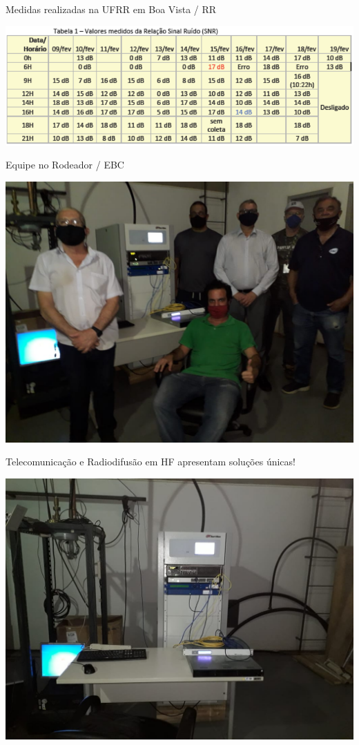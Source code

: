 \begin{frame}

  \begin{block}{Medidas realizadas na UFRR em Boa Vista / RR}
    \begin{center}
      \includegraphics[width=.9\columnwidth]{snr.jpg}
    \end{center}
  \end{block}

\end{frame}


\begin{frame}

  \begin{block}{Equipe no Rodeador / EBC}

    \begin{center}
      \includegraphics[width=.60\columnwidth]{foto.jpg}
    \end{center}

  \end{block}

\end{frame}


\begin{frame}

  \begin{center}
    Telecomunicação e Radiodifusão em HF apresentam soluções únicas!
  \end{center}

    \begin{center}
      \includegraphics[width=.7\columnwidth]{foto2.jpg}
    \end{center}


\end{frame}

